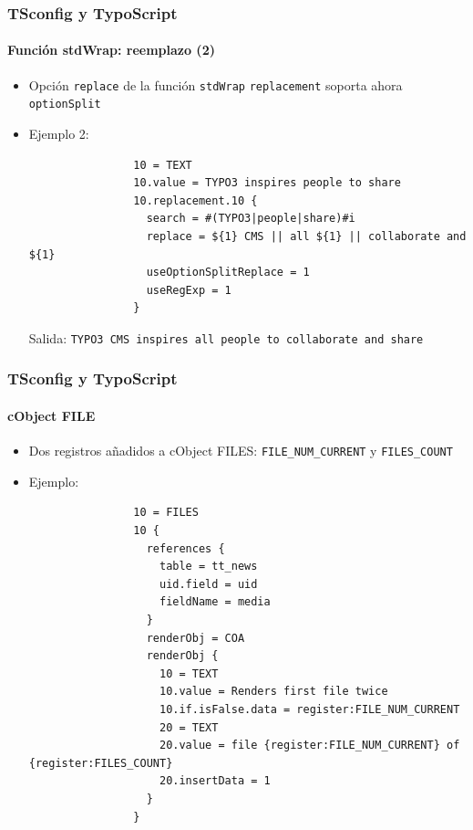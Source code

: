 
\begin{frame}[fragile]
	\frametitle{TSconfig y TypoScript}
	\framesubtitle{Función stdWrap: reemplazo (2)}

	\begin{itemize}
		\item Opción \texttt{replace} de la función \texttt{stdWrap} \texttt{replacement}\newline
			soporta ahora \texttt{optionSplit}

		\item Ejemplo 2:

			\begin{lstlisting}
				10 = TEXT
				10.value = TYPO3 inspires people to share
				10.replacement.10 {
				  search = #(TYPO3|people|share)#i
				  replace = ${1} CMS || all ${1} || collaborate and ${1}
				  useOptionSplitReplace = 1
				  useRegExp = 1
				}
			\end{lstlisting}

			Salida:\newline
				\texttt{TYPO3 CMS inspires all people to collaborate and share}

	\end{itemize}

\end{frame}


\begin{frame}[fragile]
	\frametitle{TSconfig y TypoScript}
	\framesubtitle{cObject FILE}

	\begin{itemize}
		\item Dos registros añadidos a cObject FILES:\newline
			\texttt{FILE\_NUM\_CURRENT} y \texttt{FILES\_COUNT}

		\item Ejemplo:

			\lstset{
				basicstyle=\tiny\ttfamily
			}

			\begin{lstlisting}
				10 = FILES
				10 {
				  references {
				    table = tt_news
				    uid.field = uid
				    fieldName = media
				  }
				  renderObj = COA
				  renderObj {
				    10 = TEXT
				    10.value = Renders first file twice
				    10.if.isFalse.data = register:FILE_NUM_CURRENT
				    20 = TEXT
				    20.value = file {register:FILE_NUM_CURRENT} of {register:FILES_COUNT}
				    20.insertData = 1
				  }
				}
			\end{lstlisting}

	\end{itemize}

\end{frame}

